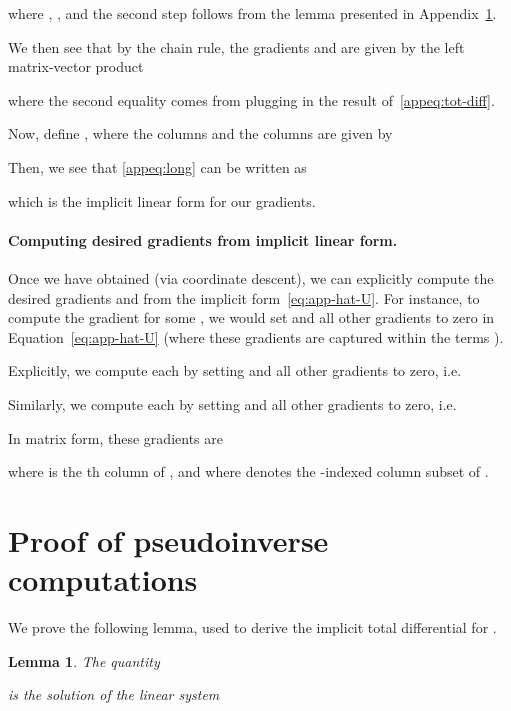 \documentclass{article}
\newtheorem{lemma}[theorem]{Lemma}
\begin{document}
{{	where , , and the second step follows from the lemma presented in Appendix~\ref{appsec:pseudoinverse-rule}.
	
	We then see that by the chain rule, the gradients  and  are given by the left matrix-vector product
	
	where the second equality comes from plugging in the result of~\eqref{appeq:tot-diff}.


	Now, define , where the columns  and the columns  are given by
	
Then, we see that \eqref{appeq:long} can be written as
	
	which is the implicit linear form for our gradients.
	
	\paragraph{Computing desired gradients from implicit linear form.} Once we have obtained  (via coordinate descent), we can explicitly compute the desired gradients  and  from the implicit form~\eqref{eq:app-hat-U}.
	For instance, to compute the gradient  for some , we would set  and all other gradients to zero in Equation~\eqref{eq:app-hat-U} (where these gradients are captured within the terms ).
	
	Explicitly, we compute each  by setting  and all other gradients to zero, i.e.
	
Similarly, we compute each  by setting  and all other gradients to zero, i.e.
	
	In matrix form, these gradients are
	
	where  is the th column of , and where  denotes the -indexed column subset of . 
	
	\iffalse










\fi
	
	\section{Proof of pseudoinverse computations}
	\label{appsec:pseudoinverse-rule}
	We prove the following lemma, used to derive the implicit total differential for .
	
	\begin{lemma}\label{lemma:inv} 
	The quantity
		
	is the solution of the linear system
		

\end{lemma}}}
\end{document}
